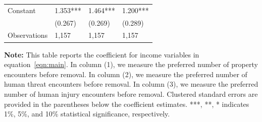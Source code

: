 \documentclass[english,12pt]{article}
\begin{document}
\begin{table}[H]
\begin{tabular}{@{}llll@{}}
        Constant    &       1.353***&       1.464***&       1.200***\\
            &     (0.267)   &     (0.269)   &     (0.289)   \\
        Observations & 1,157    &  1,157       & 1,157        \\\bottomrule
    \end{tabular}
    \begin{minipage}{.9\textwidth}
            \vspace{1em}
    \footnotesize{{\bf{Note:}} This table reports the coefficient for income variables in equation~\ref{eqn:main}. In column (1), we measure the preferred number of property encounters before removal. In column (2), we measure the preferred number of human threat encounters before removal. In column (3), we measure the preferred number of human injury encounters before removal. Clustered standard errors are provided in the parentheses below the coefficient estimates. ***, **, * indicates 1\%, 5\%, and 10\% statistical significance, respectively.}
    \label{tab: des_inc}
    \end{minipage}
\end{table}
\end{document}
